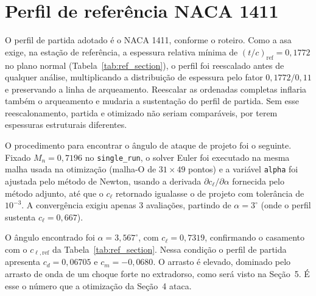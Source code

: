 \newpage
\section{Perfil de referência NACA 1411}

O perfil de partida adotado é o NACA 1411, conforme o roteiro. Como a asa
exige, na estação de referência, a espessura relativa mínima de
$(t/c)_{\mathrm{ref}} = 0{,}1772$ no plano normal
(Tabela~\ref{tab:ref_section}), o perfil foi reescalado antes de qualquer
análise, multiplicando a distribuição de espessura pelo fator
$0{,}1772/0{,}11$ e preservando a linha de arqueamento. Reescalar as
ordenadas completas inflaria também o arqueamento e mudaria a sustentação
do perfil de partida. Sem esse reescalonamento, partida e otimizado não
seriam comparáveis, por terem espessuras estruturais diferentes.

O procedimento para encontrar o ângulo de ataque de projeto foi o seguinte.
Fixado $M_n = 0{,}7196$ no \texttt{single\_run}, o solver Euler foi executado
na mesma malha usada na otimização (malha-O de $31\times 49$ pontos) e a
variável \texttt{alpha} foi ajustada pelo método de Newton, usando a derivada
$\partial c_\ell/\partial \alpha$ fornecida pelo método adjunto, até que o
$c_\ell$ retornado igualasse o de projeto com tolerância de $10^{-3}$. A
convergência exigiu apenas 3 avaliações, partindo de $\alpha = 3^\circ$
(onde o perfil sustenta $c_\ell = 0{,}667$).

O ângulo encontrado foi $\alpha = 3{,}567^\circ$, com $c_\ell = 0{,}7319$,
confirmando o casamento com o $c_{\ell,\mathrm{ref}}$ da
Tabela~\ref{tab:ref_section}. Nessa condição o perfil de partida apresenta
$c_d = 0{,}06705$ e $c_m = -0{,}0680$. O arrasto é elevado, dominado pelo
arrasto de onda de um choque forte no extradorso, como será visto na
Seção~5. É esse o número que a otimização da Seção~4 ataca.

